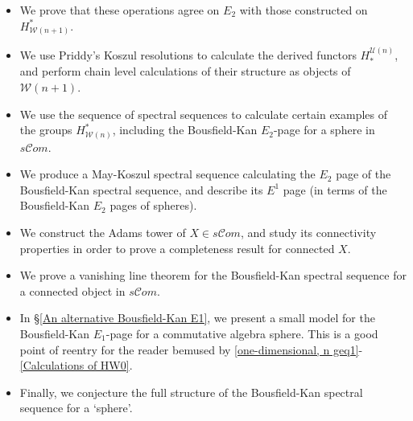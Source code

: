 \documentclass[11pt]{amsart} \renewcommand{\baselinestretch}{1.2}
\theoremstyle{plain}
\theoremstyle{definition}
\newcommand{\scrC}{\mathscr{C}}
\newcommand{\calw}{\mathcal{W}}
\newcommand{\calu}{\mathcal{U}}
\newcommand{\algs}{{\scrC\!\textit{om}}}
\begin{document}
\begin{Introduction}
\begin{itemize}
\item We prove that these operations agree on $E_2$ with those constructed on $H^*_{\calw(n+1)}$.
\item We use Priddy's Koszul resolutions to calculate the derived functors $H_*^{\calu(n)}$, and perform chain level calculations of their structure as objects of $\calw(n+1)$.
\item We use the sequence of spectral sequences to calculate certain examples of the groups $H^*_{\calw(n)}$, including the Bousfield-Kan $E_2$-page for a sphere in $s\algs$.
\item We produce a May-Koszul spectral sequence calculating the $E_2$ page of the Bousfield-Kan spectral sequence, and describe its $E^1$ page (in terms of the Bousfield-Kan $E_2$ pages of spheres).
\item We construct the Adams tower of $X\in s\algs$, and study its connectivity properties in order to prove a completeness result for connected $X$.
\item We prove a vanishing line theorem for the Bousfield-Kan spectral sequence for a connected object in $s\algs$.
\item In \S\ref{An alternative Bousfield-Kan E1}, we present a small model for the Bousfield-Kan $E_1$-page for a commutative algebra sphere. This is a good point of reentry for the reader bemused by \SS\ref{one-dimensional, n geq1}-\ref{Calculations of HW0}.
\item Finally, we conjecture the full structure of the Bousfield-Kan spectral sequence for a `sphere'.
\end{itemize}

%
%




\end{Introduction}
\end{document}
